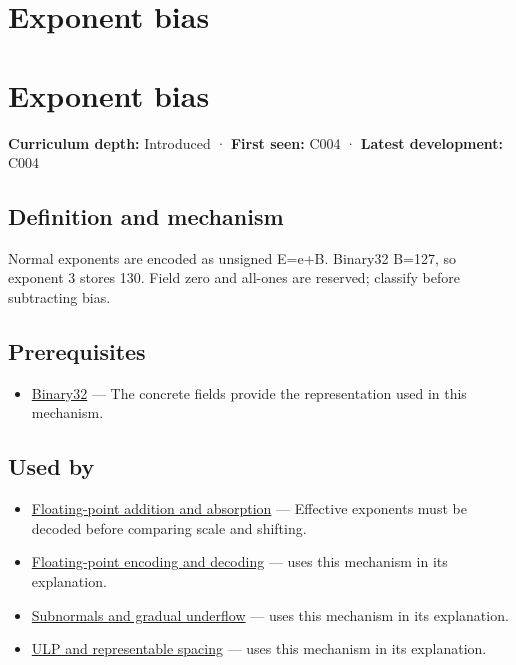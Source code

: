 \hypertarget{appendix-2fae058c82e1}{}
\section*{Exponent bias}
\section{Exponent bias}\label{exponent-bias}

\textbf{Curriculum depth:} Introduced · \textbf{First seen:} C004 · \textbf{Latest development:} C004

\subsection{Definition and mechanism}\label{definition-and-mechanism}

Normal exponents are encoded as unsigned E=e+B. Binary32 B=127, so exponent 3 stores 130. Field zero and all-ones are reserved; classify before subtracting bias.

\subsection{Prerequisites}\label{prerequisites}

\begin{itemize}
\tightlist
\item
  \hyperref[appendix-5057f9ad327f]{Binary32} --- The concrete fields provide the representation used in this mechanism.
\end{itemize}

\subsection{Used by}\label{used-by}

\begin{itemize}
\item
  \hyperref[appendix-a1b1b4580dfd]{Floating-point addition and absorption} --- Effective exponents must be decoded before comparing scale and shifting.
\item
  \hyperref[appendix-6854d0e2218e]{Floating-point encoding and decoding} --- uses this mechanism in its explanation.
\item
  \hyperref[appendix-00a6e044c437]{Subnormals and gradual underflow} --- uses this mechanism in its explanation.
\item
  \hyperref[appendix-14bab4cab9d4]{ULP and representable spacing} --- uses this mechanism in its explanation.
\end{itemize}


